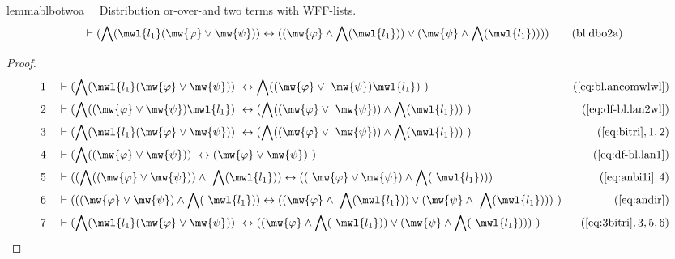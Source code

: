 \begin{restatable}{lemma}{blbotwoa}~~ Distribution or-over-and two terms with
WFF-lists.
\begin{align}
\vdash ( \bigwedge( \mwl{l_1} ( \mw{\varphi} \vee \mw{\psi} ) ) \leftrightarrow
    ( ( \mw{\varphi} \wedge \bigwedge( \mwl{l_1} ) ) \vee ( \mw{\psi} \wedge
    \bigwedge( \mwl{l_1} ) ) ) )\label{eq:bl.dbo2a}\tag{bl.dbo2a}
\end{align}
\end{restatable}

\begin{proof}
\begin{align}
  1 &&  & \vdash ( \bigwedge( \mwl{l_1} ( \mw{\varphi} \vee \mw{\psi} ) )
     ~\leftrightarrow \bigwedge( ( \mw{\varphi} \vee
     ~\mw{\psi} ) \mwl{l_1} )
     ~)&(\mbox{\ref{eq:bl.ancomwlwl}})\notag
  \\ 2 &&  & \vdash ( \bigwedge( ( \mw{\varphi} \vee \mw{\psi} ) \mwl{l_1} )
     ~\leftrightarrow ( \bigwedge( ( \mw{\varphi} \vee
     ~\mw{\psi} ) ) \wedge \bigwedge( \mwl{l_1} ) )
     ~)&(\mbox{\ref{eq:df-bl.lan2wl}})\notag
  \\ 3 &&  & \vdash ( \bigwedge( \mwl{l_1} ( \mw{\varphi} \vee \mw{\psi} ) )
     ~\leftrightarrow ( \bigwedge( ( \mw{\varphi} \vee
     ~\mw{\psi} ) ) \wedge \bigwedge( \mwl{l_1} ) )
     ~)&(\mbox{\ref{eq:bitri}},1,2)\notag
  \\ 4 &&  & \vdash ( \bigwedge( ( \mw{\varphi} \vee \mw{\psi} ) )
     ~\leftrightarrow ( \mw{\varphi} \vee \mw{\psi} )
     ~)&(\mbox{\ref{eq:df-bl.lan1}})\notag
  \\ 5 &&  & \vdash ( ( \bigwedge( ( \mw{\varphi} \vee \mw{\psi} ) ) \wedge
     ~\bigwedge( \mwl{l_1} ) ) \leftrightarrow ( (
     ~\mw{\varphi} \vee \mw{\psi} ) \wedge \bigwedge(
     ~\mwl{l_1} ) ) )&(\mbox{\ref{eq:anbi1i}},4)\notag
  \\ 6 &&  & \vdash ( ( ( \mw{\varphi} \vee \mw{\psi} ) \wedge \bigwedge(
     ~\mwl{l_1} ) ) \leftrightarrow ( ( \mw{\varphi} \wedge
     ~\bigwedge( \mwl{l_1} ) ) \vee ( \mw{\psi} \wedge
     ~\bigwedge( \mwl{l_1} ) ) )
     ~)&(\mbox{\ref{eq:andir}})\notag
  \\ 7 &&  & \vdash ( \bigwedge( \mwl{l_1} ( \mw{\varphi} \vee \mw{\psi} ) )
     ~\leftrightarrow ( ( \mw{\varphi} \wedge \bigwedge(
     ~\mwl{l_1} ) ) \vee ( \mw{\psi} \wedge \bigwedge(
     ~\mwl{l_1} ) ) )
     ~)&(\mbox{\ref{eq:3bitri}},3,5,6)\notag
\end{align}
\end{proof}

